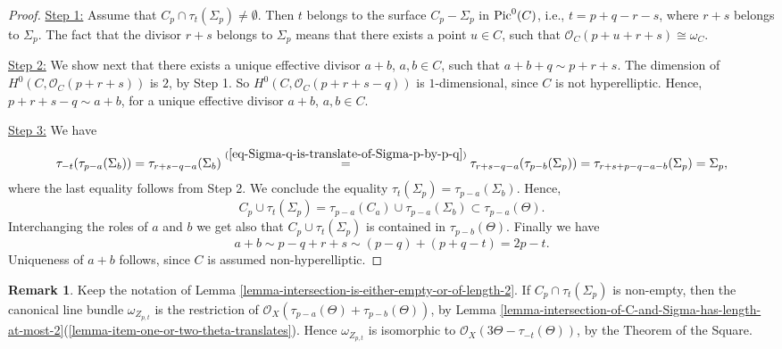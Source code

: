 \documentclass[12pt]{amsart}
\numberwithin{equation}{subsection}
\theoremstyle{plain}
\theoremstyle{definition}
\newtheorem{rem}[thm]{Remark}
\newcommand{\StructureSheaf}[1]{{\mathcal O}_{#1}}
\newcommand{\Pic}{{\rm Pic}}
\begin{document}
\begin{proof}
\underline{Step 1:}
Assume that $C_p\cap \tau_t(\Sigma_p)\neq \emptyset$. Then $t$ belongs to the surface $C_p-\Sigma_p$ in $\Pic^0(C)$, i.e., 
$t=p+q-r-s$, where $r+s$ belongs to $\Sigma_p$. The fact that the divisor $r+s$ belongs to $\Sigma_p$ means that there exists a point $u\in C$, such that $\StructureSheaf{C}(p+u+r+s)\cong \omega_C$.

\underline{Step 2:} We show next that there exists a unique effective divisor $a+b$, $a,b\in C$, such that $a+b+q\sim p+r+s$. 
The dimension of $H^0(C,\StructureSheaf{C}(p+r+s))$ is $2$, by Step 1. 
So $H^0(C,\StructureSheaf{C}(p+r+s-q))$ is $1$-dimensional, since $C$ is not hyperelliptic. Hence, 
$p+r+s-q\sim a+b$, for a unique effective divisor $a+b$, $a,b\in C$. 

\underline{Step 3:}
We have
\[
\tau_{-t}(\tau_{p-a}(\Sigma_b))=\tau_{r+s-q-a}(\Sigma_b)\stackrel{(\ref{eq-Sigma-q-is-translate-of-Sigma-p-by-p-q})}{=}
\tau_{r+s-q-a}(\tau_{p-b}(\Sigma_p))=\tau_{r+s+p-q-a-b}(\Sigma_p)=\Sigma_p,
\]
where the last equality follows from Step 2. We conclude the equality $\tau_t(\Sigma_p)=\tau_{p-a}(\Sigma_b).$
Hence,
\[
C_p\cup\tau_t(\Sigma_p)=\tau_{p-a}(C_a)\cup \tau_{p-a}(\Sigma_b) \subset \tau_{p-a}(\Theta).
\]
Interchanging the roles of $a$ and $b$ we get also that $C_p\cup\tau_t(\Sigma_p)$ is contained in $\tau_{p-b}(\Theta)$.
Finally we have
\[
a+b\sim p-q+r+s\sim (p-q)+(p+q-t)=2p-t.
\]
Uniqueness of $a+b$ follows, since $C$ is assumed non-hyperelliptic.
\end{proof}

\begin{rem}
\label{rem-intersection-is-either-empty-or-of-length-2}
Keep the notation of Lemma \ref{lemma-intersection-is-either-empty-or-of-length-2}. If $C_p\cap\tau_t(\Sigma_p)$ is non-empty,
then the canonical line bundle  $\omega_{Z_{p,t}}$ is the restriction of $\StructureSheaf{X}(\tau_{p-a}(\Theta)+\tau_{p-b}(\Theta))$, 
by Lemma \ref{lemma-intersection-of-C-and-Sigma-has-length-at-most-2}(\ref{lemma-item-one-or-two-theta-translates}). Hence 
$\omega_{Z_{p,t}}$ is isomorphic to $\StructureSheaf{X}(3\Theta-\tau_{-t}(\Theta))$, by the Theorem of the Square.
\end{rem}
\end{document}

